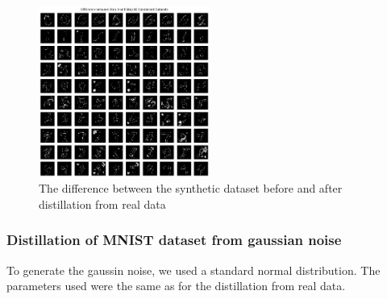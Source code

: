 \documentclass[onecolumn]{IEEEtran}
\begin{document}
\begin{figure}[H]
    \centering
    \includegraphics[width=0.5\textwidth]{images/MNIST_diff_real.png}
    \caption{The difference between the synthetic dataset before and after distillation from real data}
    \label{fig:MNIST_diff_real}
\end{figure}

\subsubsection{Distillation of MNIST dataset from gaussian noise}
To generate the gaussin noise, we used a standard normal distribution. The parameters used were the same as for the distillation from real data.
\end{document}
